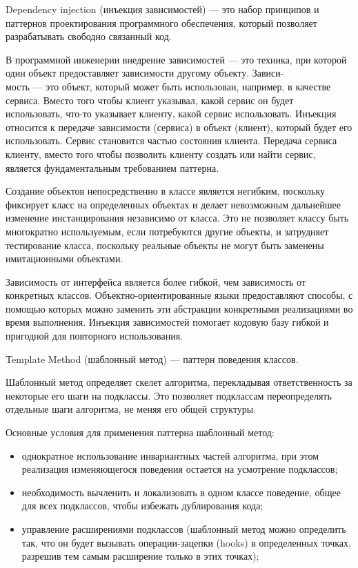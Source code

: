 Dependency injection (инъекция зависимостей) \cite{dependency_injection} --- это набор принципов и паттернов проектирования программного обеспечения, который позволяет разрабатывать свободно связанный код.

В программной инженерии внедрение зависимостей --- это техника, при которой один объект предоставляет зависимости другому объекту. Зависи-\\мость --- это объект, который может быть использован, например, в качестве сервиса. Вместо того чтобы клиент указывал, какой сервис он будет использовать, что-то указывает клиенту, какой сервис использовать. Инъекция относится к передаче зависимости (сервиса) в объект (клиент), который будет его использовать. Сервис становится частью состояния клиента. Передача сервиса клиенту, вместо того чтобы позволить клиенту создать или найти сервис, является фундаментальным требованием паттерна.

Создание объектов непосредственно в классе является негибким, поскольку фиксирует класс на определенных объектах и делает невозможным дальнейшее изменение инстанцирования независимо от класса. Это не позволяет классу быть многократно используемым, если потребуются другие объекты, и затрудняет тестирование класса, поскольку реальные объекты не могут быть заменены имитационными объектами.

Зависимость от интерфейса является более гибкой, чем зависимость от конкретных классов. Объектно-ориентированные языки предоставляют способы, с помощью которых можно заменить эти абстракции конкретными реализациями во время выполнения. Инъекция зависимостей помогает кодовую базу гибкой и пригодной для повторного использования.




Template Method (шаблонный метод) \cite{patterns} --- паттерн поведения классов.

Шаблонный метод определяет скелет алгоритма, перекладывая ответственность за некоторые его шаги на подклассы. Это позволяет подклассам переопределять отдельные шаги алгоритма, не меняя его общей структуры.

Основные условия для применения паттерна шаблонный метод:

\begin{itemize}[label*=---]
	\item однократное использование инвариантных частей алгоритма, при этом реализация изменяющегося поведения остается на усмотрение подклассов;
	\item необходимость вычленить и локализовать в одном классе поведение, общее для всех подклассов, чтобы избежать дублирования кода;
	\item управление расширениями подклассов (шаблонный метод можно определить так, что он будет вызывать операции-зацепки (hooks) в определенных точках, разрешив тем самым расширение только в этих точках);
\end{itemize}


